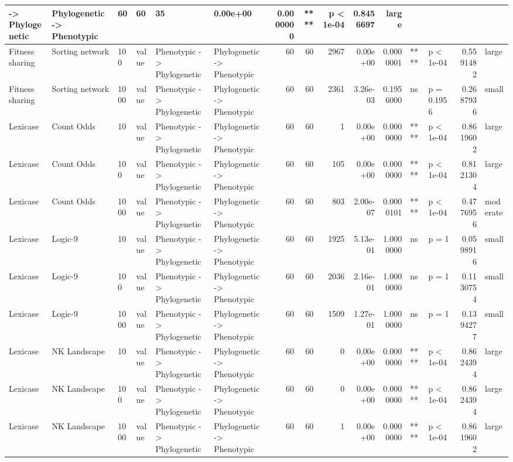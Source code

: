 \documentclass[]{book}
\begin{document}
\begin{table}
\begin{tabular}[t]{l|l|l|l|l|l|r|r|r|r|r|l|l|r|l}
    ->
Phylogenetic & Phylogenetic
    ->
Phenotypic & 60 & 60 & 35 & 0.00e+00 & 0.0000000 & **** & p < 1e-04 & 0.8456697 & large\\
\hline
Fitness sharing & Sorting network & 100 & value & Phenotypic
    ->
Phylogenetic & Phylogenetic
    ->
Phenotypic & 60 & 60 & 2967 & 0.00e+00 & 0.0000001 & **** & p < 1e-04 & 0.5591482 & large\\
\hline
Fitness sharing & Sorting network & 1000 & value & Phenotypic
    ->
Phylogenetic & Phylogenetic
    ->
Phenotypic & 60 & 60 & 2361 & 3.26e-03 & 0.1956000 & ns & p = 0.1956 & 0.2687936 & small\\
\hline
Lexicase & Count Odds & 10 & value & Phenotypic
    ->
Phylogenetic & Phylogenetic
    ->
Phenotypic & 60 & 60 & 1 & 0.00e+00 & 0.0000000 & **** & p < 1e-04 & 0.8619602 & large\\
\hline
Lexicase & Count Odds & 100 & value & Phenotypic
    ->
Phylogenetic & Phylogenetic
    ->
Phenotypic & 60 & 60 & 105 & 0.00e+00 & 0.0000000 & **** & p < 1e-04 & 0.8121304 & large\\
\hline
Lexicase & Count Odds & 1000 & value & Phenotypic
    ->
Phylogenetic & Phylogenetic
    ->
Phenotypic & 60 & 60 & 803 & 2.00e-07 & 0.0000101 & **** & p < 1e-04 & 0.4776956 & moderate\\
\hline
Lexicase & Logic-9 & 10 & value & Phenotypic
    ->
Phylogenetic & Phylogenetic
    ->
Phenotypic & 60 & 60 & 1925 & 5.13e-01 & 1.0000000 & ns & p = 1 & 0.0598916 & small\\
\hline
Lexicase & Logic-9 & 100 & value & Phenotypic
    ->
Phylogenetic & Phylogenetic
    ->
Phenotypic & 60 & 60 & 2036 & 2.16e-01 & 1.0000000 & ns & p = 1 & 0.1130754 & small\\
\hline
Lexicase & Logic-9 & 1000 & value & Phenotypic
    ->
Phylogenetic & Phylogenetic
    ->
Phenotypic & 60 & 60 & 1509 & 1.27e-01 & 1.0000000 & ns & p = 1 & 0.1394277 & small\\
\hline
Lexicase & NK Landscape & 10 & value & Phenotypic
    ->
Phylogenetic & Phylogenetic
    ->
Phenotypic & 60 & 60 & 0 & 0.00e+00 & 0.0000000 & **** & p < 1e-04 & 0.8624394 & large\\
\hline
Lexicase & NK Landscape & 100 & value & Phenotypic
    ->
Phylogenetic & Phylogenetic
    ->
Phenotypic & 60 & 60 & 0 & 0.00e+00 & 0.0000000 & **** & p < 1e-04 & 0.8624394 & large\\
\hline
Lexicase & NK Landscape & 1000 & value & Phenotypic
    ->
Phylogenetic & Phylogenetic
    ->
Phenotypic & 60 & 60 & 1 & 0.00e+00 & 0.0000000 & **** & p < 1e-04 & 0.8619602 & large\\

\end{tabular}
\end{table}
\end{document}
